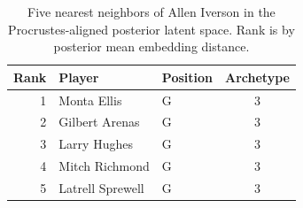 \begin{table}[htbp]
  \centering\small
  \begin{tabular}{rllc}
    \toprule
    Rank & Player & Position & Archetype \\
    \midrule
    1 & Monta Ellis & G & 3 \\
    2 & Gilbert Arenas & G & 3 \\
    3 & Larry Hughes & G & 3 \\
    4 & Mitch Richmond & G & 3 \\
    5 & Latrell Sprewell & G & 3 \\
    \bottomrule
  \end{tabular}
  \caption{Five nearest neighbors of Allen Iverson in the Procrustes-aligned posterior latent space. Rank is by posterior mean embedding distance.}
  \label{tab:Allen_Iverson_neighbors}
\end{table}

